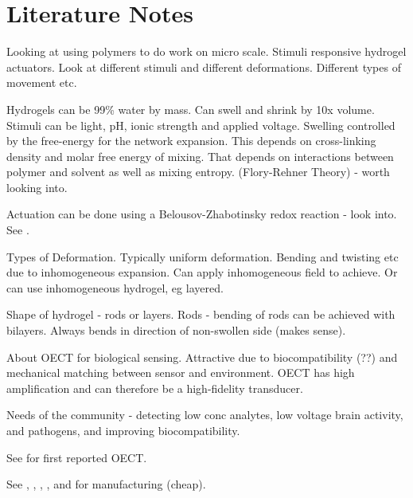 \documentclass{article}
\begin{document}
\section*{Literature Notes}



\vspace{1cm}
{\bf \cite{Ionov2014}}

Looking at using polymers to do work on micro scale.  Stimuli responsive hydrogel actuators.  Look at different stimuli and different deformations. Different types of movement etc. 

Hydrogels can be 99\% water by mass. Can swell and shrink by 10x volume. Stimuli can be light, pH, ionic strength and applied voltage.  Swelling controlled by the free-energy for the network expansion. This depends on cross-linking density and molar free energy of mixing. That depends on interactions between polymer and solvent as well as mixing entropy.  (Flory-Rehner Theory) - worth looking into. 

Actuation can be done using a Belousov-Zhabotinsky redox reaction - look into.  See \cite{Suzuki2012,Maeda2010}.  

Types of Deformation.  Typically uniform deformation. Bending and twisting etc due to inhomogeneous expansion.  Can apply inhomogeneous field to achieve.  Or can use inhomogeneous hydrogel, eg layered. 

Shape of hydrogel - rods or layers.  Rods - bending of rods can be achieved with bilayers. Always bends in direction of non-swollen side (makes sense).





\vspace{1cm}
{\bf \cite{Strakosas2015}}

About OECT for biological sensing.  Attractive due to biocompatibility (??) and mechanical matching between sensor and environment.  OECT has high amplification and can therefore be a high-fidelity transducer.  

Needs of the community - detecting low conc analytes, low voltage brain activity, and pathogens, and improving biocompatibility.  

See \cite{White1984} for first reported OECT. 

See \cite{blaudeck2012simplified}, \cite{basirico2011inkjet}, \cite{basirico2012electrical}, \cite{pettersson2014patterned}, \cite{nilsson2002all} and \cite{kawahara2013fast} for manufacturing (cheap).
\end{document}
